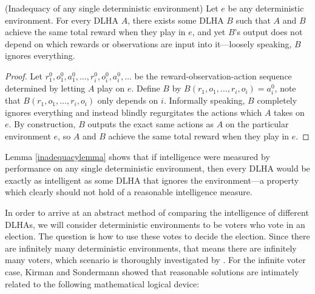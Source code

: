 \documentclass[twoside,11pt]{article}
\begin{document}
\begin{lemma}
\label{inadequacylemma}
    (Inadequacy of any single deterministic environment)
    Let $e$ be any deterministic environment.
    For every DLHA $A$, there exists some DLHA $B$ such that $A$ and $B$ achieve
    the same total reward when they play in $e$, and yet $B$'s output does not
    depend on which rewards or observations are input into it---loosely speaking,
    $B$ ignores everything.
\end{lemma}

\begin{proof}
    Let $r^0_1,o^0_1,a^0_1,\ldots,r^0_i,o^0_i,a^0_i,\ldots$ be the
    reward-observation-action sequence determined by letting $A$ play on $e$.
    Define $B$ by $B(r_1,o_1,\ldots,r_i,o_i)=a^0_i$, note that
    $B(r_1,o_1,\ldots,r_i,o_i)$ only depends on $i$. Informally speaking, $B$
    completely ignores everything and instead blindly regurgitates the actions
    which $A$ takes on $e$. By construction, $B$ outputs the exact same actions
    as $A$ on the particular environment $e$, so $A$ and $B$ achieve the same
    total reward when they play in $e$.
\end{proof}

Lemma \ref{inadequacylemma} shows that if intelligence were measured by performance
on any single deterministic environment, then every DLHA would be exactly as intelligent
as some DLHA that ignores the environment---a property which clearly should not hold of
a reasonable intelligence measure.

In order to arrive at an abstract method of comparing the intelligence of different
DLHAs, we will consider deterministic environments to be voters who vote in an election.
The question is how to use these votes to decide the election.
Since there are infinitely many deterministic environments, that means there are
infinitely many voters,
which scenario is thoroughly investigated by \citet{kirman}.
For the infinite voter case, Kirman and Sondermann showed that
reasonable solutions are intimately
related to the following mathematical logical device:
\end{document}

